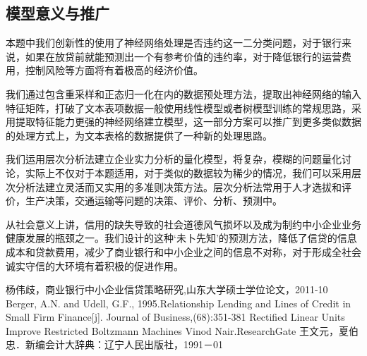 \documentclass{cumcmthesis}
\begin{document}
\subsection{模型意义与推广}
本题中我们创新性的使用了神经网络处理是否违约这一二分类问题，对于银行来说，如果在放贷前就能预测出一个有参考价值的违约率，对于降低银行的运营费用，控制风险等方面将有着极高的经济价值。

我们通过包含重采样和正态归一化在内的数据预处理方法，提取出神经网络的输入特征矩阵，打破了文本表项数据一般使用线性模型或者树模型训练的常规思路，采用提取特征能力更强的神经网络建立模型，这一部分方案可以推广到更多类似数据的处理方式上，为文本表格的数据提供了一种新的处理思路。

我们运用层次分析法建立企业实力分析的量化模型，将复杂，模糊的问题量化讨论，实际上不仅对于本题适用，对于类似的数据较为稀少的情况，我们可以采用层次分析法建立灵活而又实用的多准则决策方法。层次分析法常用于人才选拔和评价，生产决策，交通运输等问题的决策、评价、分析、预测中。

从社会意义上讲，信用的缺失导致的社会道德风气损坏以及成为制约中小企业业务健康发展的瓶颈之一。我们设计的这种‘未卜先知’的预测方法，降低了信贷的信息成本和贷款费用，减少了商业银行和中小企业之间的信息不对称，对于形成全社会诚实守信的大环境有着积极的促进作用。


\begin{thebibliography}{9}%
    杨伟歧，商业银行中小企业信贷策略研究,山东大学硕士学位论文，2011-10
    Berger, A.N. and Udell, G.F., 1995.Relationship Lending and Lines of Credit in Small Firm Finance[j]. Journal of Business,(68):351-381
    Rectified Linear Units Improve Restricted Boltzmann Machines Vinod Nair.ResearchGate
    王文元，夏伯忠．新编会计大辞典：辽宁人民出版社，1991－01
\end{thebibliography}
\end{document}
